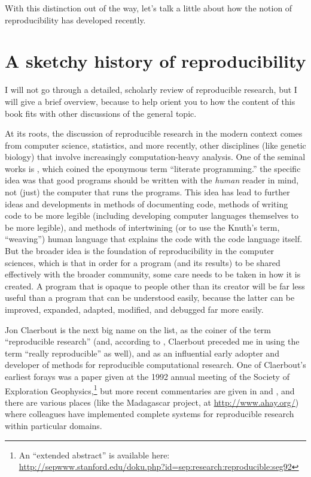 \documentclass{book}
\begin{document}
With this distinction out of the way, let's talk a little about how the notion of reproducibility has developed recently.
\section{A sketchy history of reproducibility}
\label{sec-2-2}

I will not go through a detailed, scholarly review of reproducible research, but I will give a brief overview, because to help orient you to how the content of this book fits with other discussions of the general topic.

At its roots, the discussion of reproducible research in the modern context comes from computer science, statistics, and more recently, other disciplines (like genetic biology) that involve increasingly computation-heavy analysis. One of the seminal works is \textcite{knuth1984literate}, which coined the eponymous term ``literate programming.'' the specific idea was that good programs should be written with the \emph{human} reader in mind, not (just) the computer that runs the programs. This idea has lead to further ideas and developments in methods of documenting code, methods of writing code to be more legible (including developing computer languages themselves to be more legible), and methods of intertwining (or to use the Knuth's term, ``weaving'') human language that explains the code with the code language itself. But the broader idea is the foundation of reproducibility in the computer sciences, which is that in order for a program (and its results) to be shared effectively with the broader community, some care needs to be taken in how it is created. A program that is opaque to people other than its creator will be far less useful than a program that can be understood easily, because the latter can be improved, expanded, adapted, modified, and debugged far more easily.

Jon Claerbout is the next big name on the list, as the coiner of the term ``reproducible research'' (and, according to \cite{buckheit1995wavelab}, Claerbout preceded me in using the term ``really reproducible'' as well), and as an influential early adopter and developer of methods for reproducible computational research.  One of Claerbout's earliest forays was a paper given at the 1992 annual meeting of the Society of Exploration Geophysics,\footnote{An ``extended abstract'' is available here:\\ \href{http://sepwww.stanford.edu/doku.php?id=sep:research:reproducible:seg92}{http://sepwww.stanford.edu/doku.php?id=sep:research:reproducible:seg92}
 } but more recent commentaries are given in \textcite{schwab2000making} and \textcite{fomel2009reproducible}, and there are various places (like the Madagascar project, at \href{http://www.ahay.org/}{http://www.ahay.org/}) where colleagues have implemented complete systems for reproducible research within particular domains.
\end{document}
